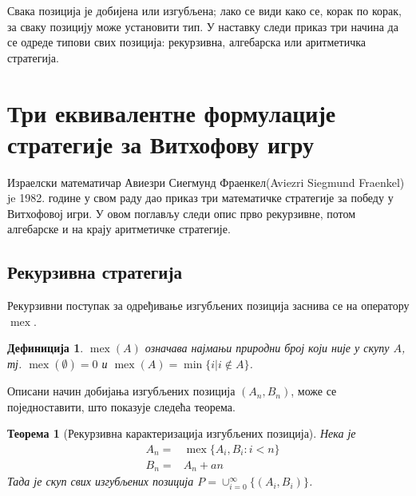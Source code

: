 \documentclass[a4paper]{article}
\newtheorem{theorem}{Теорема}
\newtheorem{definition}{Дефиниција}
\DeclareMathOperator{\mex}{mex}
\begin{document}
Свака позиција је добијена или изгубљена; лако се види како се, корак по корак, за сваку позицију може установити тип. У наставку следи приказ три начина да се одреде типови свих позиција: рекурзивна, алгебарска или аритметичка стратегија.

\section{Три еквивалентне формулације стратегије за Витхофову игру}
\label{sec:tri_Strategije}

Израелски математичар Авиезри Сиегмунд Фраенкел(Aviezri Siegmund Fraenkel) je 1982. године у свом раду \cite{10.2307/2321643} дао приказ три математичке стратегије за победу у Витхофовој игри. У овом поглављу следи опис прво рекурзивне, потом алгебарске и на крају аритметичке стратегије.

\subsection{Рекурзивна стратегија}

Рекурзивни поступак за одређивање изгубљених позиција заснива се на оператору $ \mex $.

\begin{definition}
	\label{def:mex}
	$\mex(A)$ означава најмањи природни број који није у скупу $ A $, тј. $ \mex(\emptyset)=0 $ и
$ \mex(A)=\min\{i | i\notin A\} $.
\end{definition}

Описани начин добијања изгубљених позиција $ (A_{n}, B_{n}) $, може се поједноставити, што показује следећа теорема. 

\begin{theorem} [Рекурзивна карактеризација изгубљених позиција]
	\label{thm:reukrzivna_strategija}
	Нека је 
	\begin{eqnarray}
		&A_{n} = &\mex \{ A_{i}, B_{i} : i < n \}\\
		&B_{n} = &A_{n} + an
	\end{eqnarray}
	Тада је скуп свих изгубљених позиција
	$ P = \cup_{i=0}^{\infty} \{(A_{i},B_{i})\} $.
\end{theorem}
\end{document}
